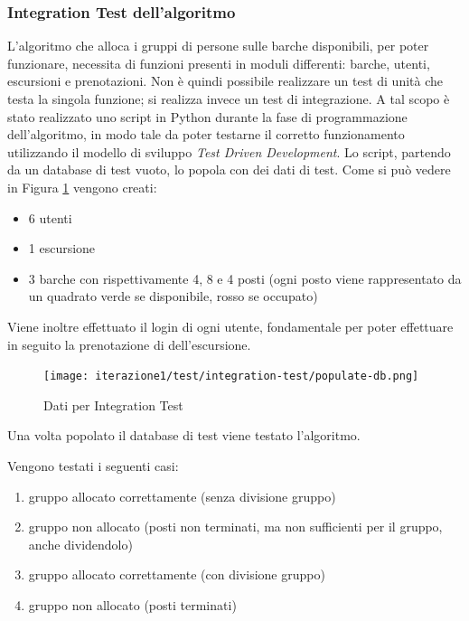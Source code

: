 \subsubsection{Integration Test dell'algoritmo}
L'algoritmo che alloca i gruppi di persone sulle barche disponibili, per poter funzionare, necessita di funzioni presenti in moduli differenti: barche, utenti, escursioni e prenotazioni. Non è quindi possibile realizzare un test di unità che testa la singola funzione; si realizza invece un test di integrazione.
A tal scopo è stato realizzato uno script in Python durante la fase di programmazione dell'algoritmo, in modo tale da poter testarne il corretto funzionamento utilizzando il modello di sviluppo \textit{Test Driven Development}.
Lo script, partendo da un database di test vuoto, lo popola con dei dati di test. Come si può vedere in Figura \ref{Dati per Integration Test} vengono creati:
\begin{itemize}
    \item 6 utenti
    \item 1 escursione
    \item 3 barche con rispettivamente 4, 8 e 4 posti (ogni posto viene rappresentato da un quadrato verde se disponibile, rosso se occupato)
\end{itemize}
Viene inoltre effettuato il login di ogni utente, fondamentale per poter effettuare in seguito la prenotazione di dell'escursione.

\begin{figure}[htbp]
    \texttt{[image: iterazione1/test/integration-test/populate-db.png]}
    \centering
    \caption{Dati per Integration Test}
    \label{Dati per Integration Test}
\end{figure}

\clearpage

Una volta popolato il database di test viene testato l'algoritmo.

Vengono testati i seguenti casi:
\begin{enumerate}
    \item gruppo allocato correttamente (senza divisione gruppo) \label{caso1}
    \item gruppo non allocato (posti non terminati, ma non sufficienti per il gruppo, anche dividendolo) \label{caso2}
    \item gruppo allocato correttamente (con divisione gruppo) \label{caso3}
    \item gruppo non allocato (posti terminati)\label{caso4}
\end{enumerate}

